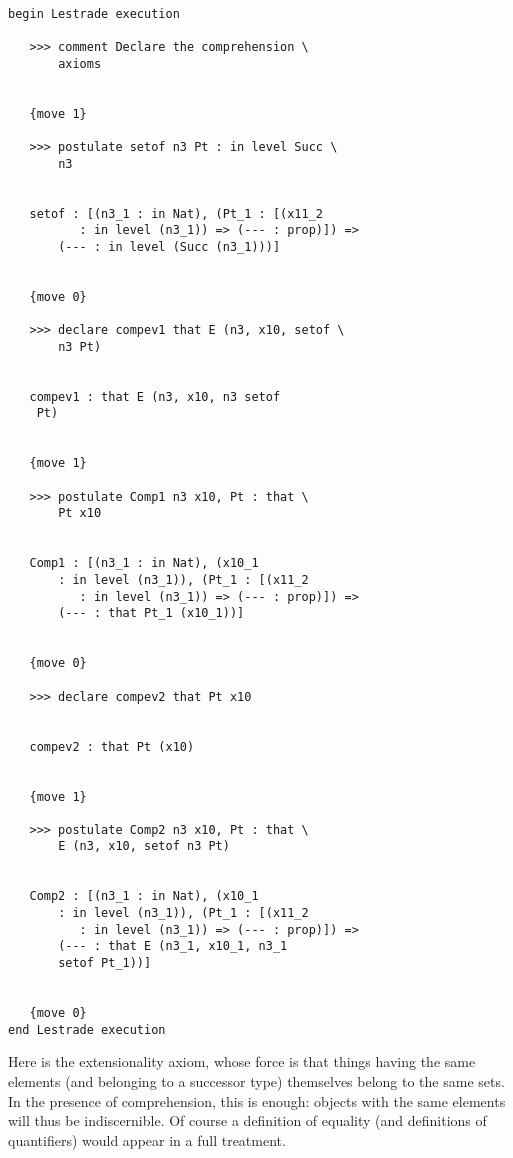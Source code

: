 \documentclass[12pt]{article}
\begin{document}
\begin{verbatim}

begin Lestrade execution

   >>> comment Declare the comprehension \
       axioms


   {move 1}

   >>> postulate setof n3 Pt : in level Succ \
       n3


   setof : [(n3_1 : in Nat), (Pt_1 : [(x11_2 
          : in level (n3_1)) => (--- : prop)]) => 
       (--- : in level (Succ (n3_1)))]


   {move 0}

   >>> declare compev1 that E (n3, x10, setof \
       n3 Pt)


   compev1 : that E (n3, x10, n3 setof 
    Pt)


   {move 1}

   >>> postulate Comp1 n3 x10, Pt : that \
       Pt x10


   Comp1 : [(n3_1 : in Nat), (x10_1 
       : in level (n3_1)), (Pt_1 : [(x11_2 
          : in level (n3_1)) => (--- : prop)]) => 
       (--- : that Pt_1 (x10_1))]


   {move 0}

   >>> declare compev2 that Pt x10


   compev2 : that Pt (x10)


   {move 1}

   >>> postulate Comp2 n3 x10, Pt : that \
       E (n3, x10, setof n3 Pt)


   Comp2 : [(n3_1 : in Nat), (x10_1 
       : in level (n3_1)), (Pt_1 : [(x11_2 
          : in level (n3_1)) => (--- : prop)]) => 
       (--- : that E (n3_1, x10_1, n3_1 
       setof Pt_1))]


   {move 0}
end Lestrade execution
\end{verbatim}

Here is the extensionality axiom, whose force is that things having the same elements (and belonging to a successor type) themselves belong to the same sets.
In the presence of comprehension, this is enough:  objects with the same elements will thus be indiscernible.  Of course a definition of equality (and definitions of quantifiers)
would appear in a full treatment.
\end{document}

